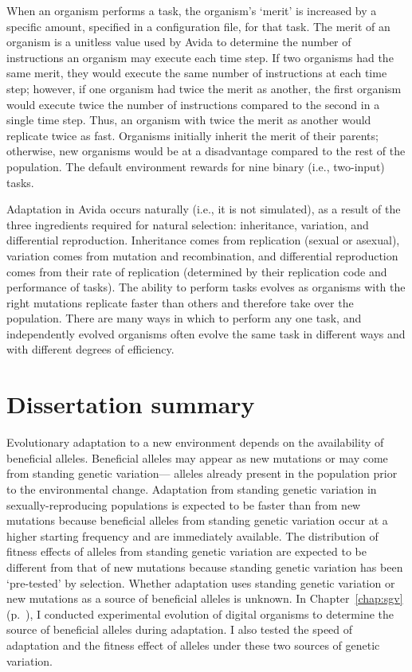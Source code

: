 \begin{doublespace}
When an organism performs a task, the organism's `merit' is increased
by a specific amount, specified in a configuration file, for that task.
%
The merit of an organism is a unitless value used by Avida
to determine the number of instructions an organism may execute each time step.
%
If two organisms had the same merit,
they would execute the same number of instructions at each time step;
however, if one organism had twice the merit as another,
the first organism would execute twice the number of instructions
compared to the second in a single time step.
%
Thus, an organism with twice the merit as another
would replicate twice as fast.
%
Organisms initially inherit the merit of their parents;
otherwise, new organisms would be at a disadvantage
compared to the rest of the population.
%
The default environment rewards for nine binary (i.e., two-input) tasks.



Adaptation in Avida occurs naturally (i.e., it is not simulated),
as a result of the three ingredients required for natural selection:
inheritance, variation, and differential reproduction.
%
Inheritance comes from replication (sexual or asexual),
variation comes from mutation and recombination,
and differential reproduction comes from their rate of replication
(determined by their replication code and performance of tasks).
%
The ability to perform tasks evolves as organisms with the right mutations
replicate faster than others and therefore take over the population.
%
There are many ways in which to perform any one task,
and independently evolved organisms often evolve the same task
in different ways and with different degrees of efficiency.



\section*{Dissertation summary}

Evolutionary adaptation to a new environment
depends on the availability of beneficial alleles.
%
Beneficial alleles may appear as new mutations
or may come from standing genetic variation---%
alleles already present in the population
prior to the environmental change.
%
Adaptation from standing genetic variation
in sexually-reproducing populations
is expected to be faster than from new mutations
because beneficial alleles from standing genetic variation
occur at a higher starting frequency and are immediately available.
%
The distribution of fitness effects of alleles
from standing genetic variation are expected to be different
from that of new mutations because standing genetic variation
has been `pre-tested' by selection.
%
Whether adaptation uses standing genetic variation
or new mutations as a source of beneficial alleles is unknown.
%
In Chapter~\ref{chap:sgv} (p.~\pageref{chap:sgv}),
I conducted experimental evolution of digital organisms
to determine the source of beneficial alleles during adaptation.
%
I also tested the speed of adaptation
and the fitness effect of alleles
under these two sources of genetic variation.




\end{doublespace}
